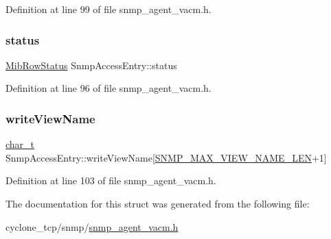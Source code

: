 Definition at line 99 of file snmp\+\_\+agent\+\_\+vacm.\+h.

\mbox{\label{structSnmpAccessEntry_a8abdd58d85a24efce6aba1b1948f1616}} 
\subsubsection{\texorpdfstring{status}{status}}
{\footnotesize\ttfamily \hyperlink{mib__common_8h_a40ce1ea958f5c3b04f841d76f5557097}{Mib\+Row\+Status} Snmp\+Access\+Entry\+::status}



Definition at line 96 of file snmp\+\_\+agent\+\_\+vacm.\+h.

\mbox{\label{structSnmpAccessEntry_a44bdb9c26c3158808b9c65daa418b8ce}} 
\subsubsection{\texorpdfstring{write\+View\+Name}{writeViewName}}
{\footnotesize\ttfamily \hyperlink{compiler__port_8h_a40bb5262bf908c328fbcfbe5d29d0201}{char\+\_\+t} Snmp\+Access\+Entry\+::write\+View\+Name\mbox{[}\hyperlink{snmp__common_8h_a8188d8ada88e9fc2c0a6d2010105b14c}{S\+N\+M\+P\+\_\+\+M\+A\+X\+\_\+\+V\+I\+E\+W\+\_\+\+N\+A\+M\+E\+\_\+\+L\+EN}+1\mbox{]}}



Definition at line 103 of file snmp\+\_\+agent\+\_\+vacm.\+h.



The documentation for this struct was generated from the following file\+:\begin{DoxyCompactItemize}
\item 
cyclone\+\_\+tcp/snmp/\hyperlink{snmp__agent__vacm_8h}{snmp\+\_\+agent\+\_\+vacm.\+h}\end{DoxyCompactItemize}
